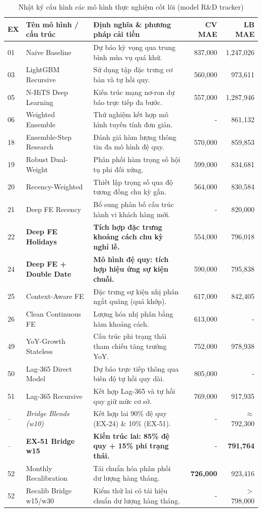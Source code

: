 \documentclass{article}
\begin{document}
\begin{table}[H]
\caption{Nhật ký cấu hình các mô hình thực nghiệm cốt lõi (model R\&D tracker)}
\label{tab:experiments}
\centering
\small
\begin{tabular}{@{}llp{7cm}rr@{}}
\toprule
EX & Tên mô hình / cấu trúc & Định nghĩa \& phương pháp cải tiến & CV MAE & LB MAE \\
\midrule
01 & Naive Baseline & Dự báo kỳ vọng qua trung bình mùa vụ quá khứ. & 837,000 & 1,247,026 \\
03 & LightGBM Recursive & Sử dụng tập đặc trưng cơ bản và tự hồi quy. & 560,000 & 973,611 \\
05 & N-HiTS Deep Learning & Kiến trúc mạng nơ-ron dự báo trực tiếp đa bước. & 557,000 & 1,287,946 \\
06 & Weighted Ensemble & Thử nghiệm kết hợp mô hình tuyến tính đơn giản. & - & 861,132 \\
18 & Ensemble-Step Research & Đánh giá hàm lượng thông tin đa mô hình đệ quy. & 570,000 & 859,853 \\
19 & Robust Dual-Weight & Phân phối hàm trọng số hội tụ phi đối xứng. & 599,000 & 834,681 \\
20 & Recency-Weighted & Thiết lập trọng số qua độ tương đồng chu kỳ gần. & 564,000 & 830,584 \\
21 & Deep FE Recency & Bổ sung phân bố cấu trúc hành vi khách hàng mới. & - & 820,000 \\
22 & \textbf{Deep FE Holidays} & \textbf{Tích hợp đặc trưng khoảng cách chu kỳ nghỉ lễ.} & 554,000 & 796,018 \\
24 & \textbf{Deep FE + Double Date} & \textbf{Mô hình đệ quy: tích hợp hiệu ứng sự kiện chuỗi.} & 590,000 & 795,838 \\
25 & Context-Aware FE & Đặc trưng sự kiện nhị phân ngắt quãng (quá khớp). & 617,000 & 842,405 \\
26 & Clean Continuous FE & Lượng hóa nhị phân bằng hàm khoảng cách. & 613,000 & - \\
49 & YoY-Growth Stateless & Cấu trúc phi trạng thái tham chiếu tăng trưởng YoY. & 752,000 & 978,938 \\
50 & Lag-365 Direct Model & Dự báo trực tiếp thông qua biên độ tự hồi quy dài. & 805,000 & - \\
51 & Lag-365 Recursive & Kết hợp Lag-365 và tự hồi quy giữ mức cơ sở. & 769,000 & 917,935 \\
-- & \textit{Bridge Blends (w10)} & Kết hợp lai 90\% đệ quy (EX-24) \& 10\% (EX-51). & - & $\approx$792,300 \\
-- & \textbf{EX-51 Bridge w15} & \textbf{Kiến trúc lai: 85\% đệ quy + 15\% phi trạng thái.} & - & \textbf{791,764} \\
52 & Monthly Recalibration & Tái chuẩn hóa phân phối dư lượng hàng tháng. & \textbf{726,000} & 923,416 \\
52 & Recalib Bridge w15/w30 & Kiểm thử lai có tái hiệu chuẩn dư lượng hàng tháng. & - & $>$798,000 \\
\bottomrule
\end{tabular}
\end{table}
\end{document}
